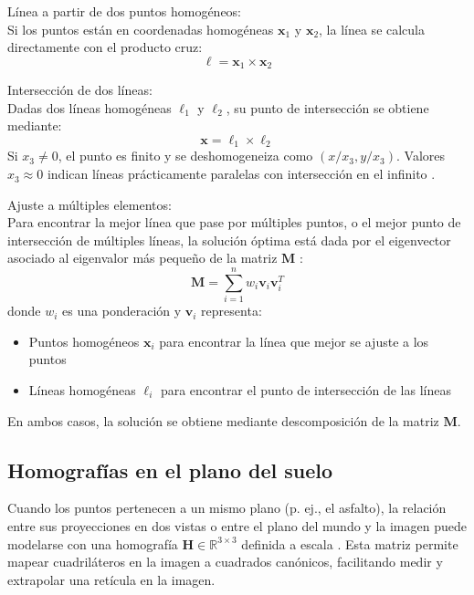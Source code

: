 Línea a partir de dos puntos homogéneos:\\
Si los puntos están en coordenadas homogéneas $\mathbf{x}_1$ y $\mathbf{x}_2$, la línea se calcula directamente con el producto cruz:
\begin{equation}
	\ell = \mathbf{x}_1 \times \mathbf{x}_2
\end{equation}

Intersección de dos líneas:\\
Dadas dos líneas homogéneas $\ell_1$ y $\ell_2$, su punto de intersección se obtiene mediante:
\begin{equation}
	\mathbf{x} = \ell_1 \times \ell_2
\end{equation}
Si $x_3 \neq 0$, el punto es finito y se deshomogeneiza como $(x/x_3, y/x_3)$. Valores $x_3 \approx 0$ indican líneas prácticamente paralelas con intersección en el infinito \cite{hartley2003multiple}.

Ajuste a múltiples elementos:\\
Para encontrar la mejor línea que pase por múltiples puntos, o el mejor punto de intersección de múltiples líneas, la solución óptima está dada por el eigenvector asociado al eigenvalor más pequeño de la matriz $\mathbf{M}$ \cite{kanatani1998statistical}:
\begin{equation}
	\mathbf{M} = \sum_{i=1}^{n} w_i \mathbf{v}_i \mathbf{v}_i^T
\end{equation}
donde $w_i$ es una ponderación y $\mathbf{v}_i$ representa:
\begin{itemize}
	\item Puntos homogéneos $\mathbf{x}_i$ para encontrar la línea que mejor se ajuste a los puntos
	\item Líneas homogéneas $\ell_i$ para encontrar el punto de intersección de las líneas
\end{itemize}
En ambos casos, la solución se obtiene mediante descomposición de la matriz $\mathbf{M}$.

\subsection{Homografías en el plano del suelo}\label{subsec:homografias}

Cuando los puntos pertenecen a un mismo plano (p. ej., el asfalto),
la relación entre sus proyecciones en dos vistas o entre el plano del mundo
y la imagen puede modelarse con una homografía
\(\mathbf{H}\in\mathbb{R}^{3\times3}\)
definida a escala \cite{hartley2003multiple}.
Esta matriz permite mapear cuadriláteros en la imagen a cuadrados canónicos,
facilitando medir y extrapolar una retícula en la imagen.

